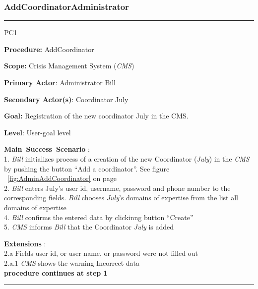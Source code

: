 \subsubsection{AddCoordinatorAdministrator}

\vspace{0.5cm}
\hrule
\begin{lyxlist}{PC1}
\small{
\item [\textbf{Procedure:}] AddCoordinator
\item [\textbf{Scope:}] Crisis Management System (\emph{CMS})
\item [\textbf{Primary Actor}:] Administrator Bill
\item [\textbf{Secondary Actor(s)}:] Coordinator July
\item [\textbf{Goal:}] Registration of the new coordinator July in the CMS.
\item [\textbf{Level}:] User-goal level
\item [\textbf{Main~Success~Scenario}]:\\
1. \emph{Bill} initializes process of a creation of the new Coordinator
(\emph{July}) in the \emph{CMS} by pushing the button ``Add a coordinator''. See
figure ~\ref{fig:AdminAddCoordinator} on page~\pageref{fig:AdminAddCoordinator}\\
2. \emph{Bill} enters July's user id, username, password and phone number to the
corresponding fields. \emph{Bill} chooses \emph{July}'s domains of expertise
from the list all domains of expertise\\
4. \emph{Bill} confirms the entered data by clickinng button ``Create''\\
5. \emph{CMS} informs \emph{Bill} that the Coordinator \emph{July} is added

\item [\textbf{Extensions}]:\\
2.a Fields user id, or user name, or password were not filled out\\
\hspace*{0.5cm} 2.a.1 \emph{CMS} shows the warning Incorrect data\\
\hspace*{0.5cm} \textbf{procedure continues at step 1}

}
\end{lyxlist}
\hrule
\vspace{0.5cm}

